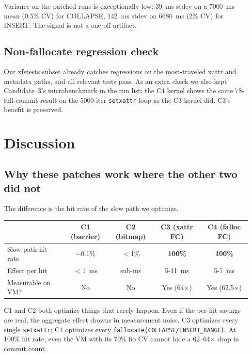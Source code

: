 \documentclass[11pt,a4paper]{article}
\begin{document}
Variance on the patched runs is exceptionally low: 39~ms stdev on a
7000~ms mean (0.5\% CV) for COLLAPSE, 142~ms stdev on 6680~ms
(2\% CV) for INSERT. The signal is not a one-off artifact.

\subsection{Non-fallocate regression check}

Our xfstests subset already catches regressions on the
most-traveled xattr and metadata paths, and all relevant tests
pass. As an extra check we also kept Candidate~3's microbenchmark
in the run list: the C4 kernel shows the same 78-full-commit result
on the 5000-iter \texttt{setxattr} loop as the C3 kernel did. C3's
benefit is preserved.

\section{Discussion}

\subsection{Why these patches work where the other two did not}

The difference is the hit rate of the slow path we optimize.

\begin{center}
\begin{tabular}{lcccc}
\toprule
 & C1 (barrier) & C2 (bitmap) & \textbf{C3 (xattr FC)} & \textbf{C4 (falloc FC)} \\
\midrule
Slow-path hit rate & $\sim$0.1\% & $<$1\% & \textbf{100\%} & \textbf{100\%} \\
Effect per hit     & $<$1~ms     & sub-ms & 5-11~ms         & 5-7~ms \\
Measurable on VM?  & No          & No     & Yes (64$\times$) & Yes (62.5$\times$) \\
\bottomrule
\end{tabular}
\end{center}

C1 and C2 both optimize things that rarely happen. Even if the
per-hit savings are real, the aggregate effect drowns in
measurement noise. C3 optimizes every single \texttt{setxattr}; C4
optimizes every \texttt{fallocate(COLLAPSE/INSERT\_RANGE)}. At
100\% hit rate, even the VM with its 70\% fio CV cannot hide a
62--64$\times$ drop in commit count.
\end{document}
